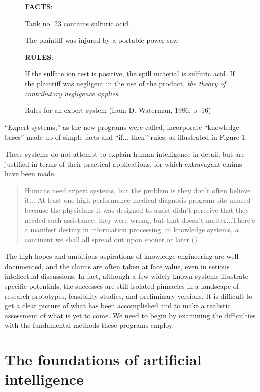 \documentclass[12pt]{article}
\begin{document}
\newpage

\begin{figure}
{\bf FACTS}:

\medskip
\noindent
Tank no. 23 contains sulfuric acid.

\noindent
The plaintiff was injured by a portable power saw.

\medskip

{\bf RULES}:

\medskip
\noindent
If the sulfate ion test is positive, the spill material is sulfuric acid. If the plaintiff was negligent in the use of the product, {\it the theory of contributory negligence applies}.

\caption{Rules for an expert system (from D. Waterman, 1986, p. 16)}
\end{figure}

\goodbreak

``Expert systems,'' as the new programs were called, incorporate ``knowledge bases'' made up of simple facts and ``if... then'' rules, as illustrated in Figure 1.

These systems do not attempt to explain human intelligence in detail, but are justified in terms of their practical applications, for which extravagant claims have been made.

\begin{quote}
Humans need expert systems, but the problem is they don't often believe it... At least one high-performance medical diagnosis program sits unused because the physicians it was designed to assist didn't perceive that they needed such assistance; they were wrong, but that doesn't matter...There's a manifest destiny in information processing, in knowledge systems, a continent we shall all spread out upon sooner or later ({\it \cite{mccorduck1983})}.
\end{quote}

The high hopes and ambitious aspirations of knowledge engineering are well-documented, and the claims are often taken at face value, even in serious intellectual discussions. In fact, although a few widely-known systems illustrate specific potentials, the successes are still isolated pinnacles in a landscape of research prototypes, feasibility studies, and preliminary versions. It is difficult to get a clear picture of what has been accomplished and to make a realistic assessment of what is yet to come. We need to begin by examining the difficulties with the fundamental methods these programs employ.

\section{The foundations of artificial intelligence}
\end{document}
